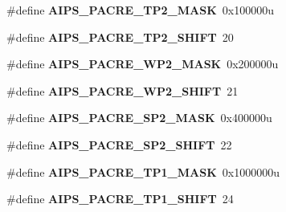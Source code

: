 \begin{DoxyCompactItemize}
\item 
\hypertarget{group___a_i_p_s___register___masks_gac886e6e40113092b7fd454edb0df9f77}{}\#define {\bfseries A\+I\+P\+S\+\_\+\+P\+A\+C\+R\+E\+\_\+\+T\+P2\+\_\+\+M\+A\+S\+K}~0x100000u\label{group___a_i_p_s___register___masks_gac886e6e40113092b7fd454edb0df9f77}

\item 
\hypertarget{group___a_i_p_s___register___masks_gab8ec47c762babccfcbd072534c5d89e9}{}\#define {\bfseries A\+I\+P\+S\+\_\+\+P\+A\+C\+R\+E\+\_\+\+T\+P2\+\_\+\+S\+H\+I\+F\+T}~20\label{group___a_i_p_s___register___masks_gab8ec47c762babccfcbd072534c5d89e9}

\item 
\hypertarget{group___a_i_p_s___register___masks_ga4484064537555aa3ca213387cb8402cc}{}\#define {\bfseries A\+I\+P\+S\+\_\+\+P\+A\+C\+R\+E\+\_\+\+W\+P2\+\_\+\+M\+A\+S\+K}~0x200000u\label{group___a_i_p_s___register___masks_ga4484064537555aa3ca213387cb8402cc}

\item 
\hypertarget{group___a_i_p_s___register___masks_gaafcca6383b332c9651dcbbdbf1f0cced}{}\#define {\bfseries A\+I\+P\+S\+\_\+\+P\+A\+C\+R\+E\+\_\+\+W\+P2\+\_\+\+S\+H\+I\+F\+T}~21\label{group___a_i_p_s___register___masks_gaafcca6383b332c9651dcbbdbf1f0cced}

\item 
\hypertarget{group___a_i_p_s___register___masks_ga18dc4372da0063d02945dae766caea0d}{}\#define {\bfseries A\+I\+P\+S\+\_\+\+P\+A\+C\+R\+E\+\_\+\+S\+P2\+\_\+\+M\+A\+S\+K}~0x400000u\label{group___a_i_p_s___register___masks_ga18dc4372da0063d02945dae766caea0d}

\item 
\hypertarget{group___a_i_p_s___register___masks_gafcb298b0b5ed252387c93856098224bd}{}\#define {\bfseries A\+I\+P\+S\+\_\+\+P\+A\+C\+R\+E\+\_\+\+S\+P2\+\_\+\+S\+H\+I\+F\+T}~22\label{group___a_i_p_s___register___masks_gafcb298b0b5ed252387c93856098224bd}

\item 
\hypertarget{group___a_i_p_s___register___masks_gaea0dc80ac611772aae4f10faff9ae96e}{}\#define {\bfseries A\+I\+P\+S\+\_\+\+P\+A\+C\+R\+E\+\_\+\+T\+P1\+\_\+\+M\+A\+S\+K}~0x1000000u\label{group___a_i_p_s___register___masks_gaea0dc80ac611772aae4f10faff9ae96e}

\item 
\hypertarget{group___a_i_p_s___register___masks_gaaca8bd73da3c08ad627917ff79bbffe8}{}\#define {\bfseries A\+I\+P\+S\+\_\+\+P\+A\+C\+R\+E\+\_\+\+T\+P1\+\_\+\+S\+H\+I\+F\+T}~24\label{group___a_i_p_s___register___masks_gaaca8bd73da3c08ad627917ff79bbffe8}


\end{DoxyCompactItemize}
